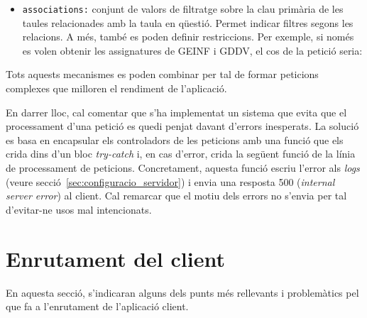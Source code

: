 \documentclass[a4paper,12pt]{ThesisStyle}
\begin{document}
\begin{itemize}
\begin{itemize}
    \begin{center}
      \texttt{}
    \end{center}
    \item \texttt{associations:} conjunt de valors de filtratge sobre la clau primària de les taules relacionades amb la taula en qüestió. Permet indicar filtres segons les relacions. A més, també es poden definir restriccions. Per exemple, si només es volen obtenir les assignatures de GEINF i GDDV, el cos de la petició seria:\\[-0.6cm]
    \begin{center}
      \texttt{}
    \end{center}
  \end{itemize}
\end{itemize}

Tots aquests mecanismes es poden combinar per tal de formar peticions complexes que milloren el rendiment de l'aplicació.

En darrer lloc, cal comentar que s'ha implementat un sistema que evita que el processament d'una petició es quedi penjat davant d'errors inesperats. La solució es basa en encapsular els controladors de les peticions amb una funció que els crida dins d'un bloc \textit{try-catch} i, en cas d'error, crida la següent funció de la línia de processament de peticions. Concretament, aquesta funció escriu l'error als \textit{logs} (veure secció~\ref{sec:configuracio_servidor}) i envia una resposta 500 (\textit{internal server error}) al client. Cal remarcar que el motiu dels errors no s'envia per tal d'evitar-ne usos mal intencionats.

\section{Enrutament del client}
\label{sec:enrutament_client}

En aquesta secció, s'indicaran alguns dels punts més rellevants i problemàtics pel que fa a l'enrutament de l'aplicació client.
\end{document}
